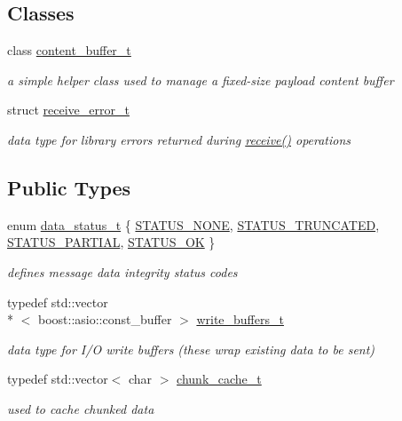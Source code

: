 \subsection*{Classes}
\begin{DoxyCompactItemize}
\item 
class \hyperlink{classpion_1_1http_1_1message_1_1content__buffer__t}{content\-\_\-buffer\-\_\-t}
\begin{DoxyCompactList}\small\item\em a simple helper class used to manage a fixed-\/size payload content buffer \end{DoxyCompactList}\item 
struct \hyperlink{structpion_1_1http_1_1message_1_1receive__error__t}{receive\-\_\-error\-\_\-t}
\begin{DoxyCompactList}\small\item\em data type for library errors returned during \hyperlink{classpion_1_1http_1_1message_a7e3c3f1ea265f91b87a9e075234b5d31}{receive()} operations \end{DoxyCompactList}\end{DoxyCompactItemize}
\subsection*{Public Types}
\begin{DoxyCompactItemize}
\item 
enum \hyperlink{classpion_1_1http_1_1message_ab71e06f72cacb4945dbf84663b0420e9}{data\-\_\-status\-\_\-t} \{ \hyperlink{classpion_1_1http_1_1message_ab71e06f72cacb4945dbf84663b0420e9a857bcfd3cb3884033f73a22e9d5ade05}{S\-T\-A\-T\-U\-S\-\_\-\-N\-O\-N\-E}, 
\hyperlink{classpion_1_1http_1_1message_ab71e06f72cacb4945dbf84663b0420e9ab69b544af26550d7cf5b0a795078715c}{S\-T\-A\-T\-U\-S\-\_\-\-T\-R\-U\-N\-C\-A\-T\-E\-D}, 
\hyperlink{classpion_1_1http_1_1message_ab71e06f72cacb4945dbf84663b0420e9a4b310a8c8463d24ac0d8073eba11ef4a}{S\-T\-A\-T\-U\-S\-\_\-\-P\-A\-R\-T\-I\-A\-L}, 
\hyperlink{classpion_1_1http_1_1message_ab71e06f72cacb4945dbf84663b0420e9a5fd3c3fcefd1a51ee076e40708e32674}{S\-T\-A\-T\-U\-S\-\_\-\-O\-K}
 \}
\begin{DoxyCompactList}\small\item\em defines message data integrity status codes \end{DoxyCompactList}\item 
typedef std\-::vector\\*
$<$ boost\-::asio\-::const\-\_\-buffer $>$ \hyperlink{classpion_1_1http_1_1message_aacf9a6a7677c32e4ab764ac97d0b5e7b}{write\-\_\-buffers\-\_\-t}
\begin{DoxyCompactList}\small\item\em data type for I/\-O write buffers (these wrap existing data to be sent) \end{DoxyCompactList}\item 
typedef std\-::vector$<$ char $>$ \hyperlink{classpion_1_1http_1_1message_a4bcf1ea1d4e7a5637d04ae109adb5e46}{chunk\-\_\-cache\-\_\-t}
\begin{DoxyCompactList}\small\item\em used to cache chunked data \end{DoxyCompactList}\end{DoxyCompactItemize}
